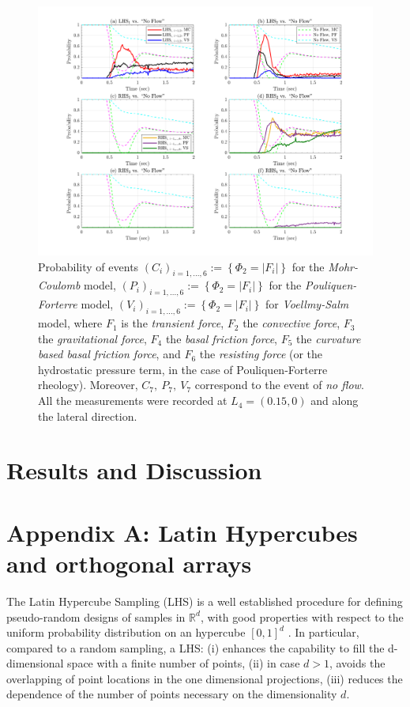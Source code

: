 \documentclass{article}
\begin{document}
\begin{figure}[H]
        \centering
        \includegraphics[width=1\textwidth]{InclinedPlane/LocalRecords/DominancePrY_L4.png}
        \caption{Probability of events $(C_i)_{i=1,...,6}:=\left\{\Phi_2=|F_i|\right\}$ for the \emph{Mohr-Coulomb} model, $(P_i)_{i=1,...,6}:=\left\{\Phi_2=|F_i|\right\}$ for the \emph{Pouliquen-Forterre} model, $(V_i)_{i=1,...,6}:=\left\{\Phi_2=|F_i|\right\}$ for \emph{Voellmy-Salm} model, where $F_1$ is the \emph{transient force}, $F_2$ the \emph{convective force}, $F_3$ the \emph{gravitational force}, $F_4$ the \emph{basal friction force}, $F_5$ the \emph{curvature based basal friction force}, and $F_6$ the \emph{resisting force} (or the hydrostatic pressure term, in the case of Pouliquen-Forterre rheology). Moreover, $C_7,\ P_7,\ V_7$ correspond to the event of \emph{no flow}. All the measurements were recorded at $L_4=(0.15,0)$ and along the lateral direction.}
        \label{fig:Ramp-FYDominance-L4}
\end{figure}


\section{Results and Discussion}

\section*{Appendix A: Latin Hypercubes and orthogonal arrays}
The Latin Hypercube Sampling (LHS) is a well established procedure for defining pseudo-random designs of samples in $\mathbb R^d$, with good properties with respect to the uniform probability distribution on an hypercube $[0,1]^d$ \citep{McKay1979,Owen1992b,Stein1987,Ranjan2014,Mingyao2016}. In particular, compared to a random sampling, a LHS: (i) enhances the capability to fill the d-dimensional space with a finite number of points, (ii) in case $d>1$, avoids the overlapping of point locations in the one dimensional projections, (iii) reduces the dependence of the number of points necessary on the dimensionality $d$.
\end{document}
